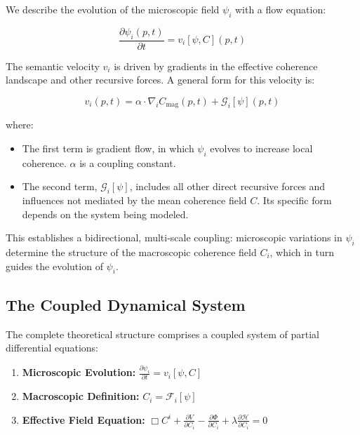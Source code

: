 We describe the evolution of the microscopic field \(\psi_i\) with a flow equation:

\begin{equation}
\frac{\partial \psi_i(p, t)}{\partial t} = v_i[\psi, C](p, t)
\end{equation}

The semantic velocity \(v_i\) is driven by gradients in the effective coherence landscape and other recursive forces. A general form for this velocity is:

\begin{equation}
v_i(p, t) = \alpha \cdot \nabla_i C_{\mathrm{mag}}(p, t) + \mathcal{G}_i[\psi](p, t)
\end{equation}

where:

\begin{itemize}

    \item The first term is gradient flow, in which \(\psi_i\) evolves to increase local coherence. \(\alpha\) is a coupling constant.
    
    \item The second term, \(\mathcal{G}_i[\psi]\), includes all other direct recursive forces and influences not mediated by the mean coherence field \(C\). Its specific form depends on the system being modeled.

\end{itemize}

This establishes a bidirectional, multi-scale coupling: microscopic variations in \(\psi_i\) determine the structure of the macroscopic coherence field \(C_i\), which in turn guides the evolution of \(\psi_i\).


\subsection{The Coupled Dynamical System}
\label{6.5.2:the_coupled_dynamical_system}

The complete theoretical structure comprises a coupled system of partial differential equations:

\begin{enumerate}

    \item \textbf{Microscopic Evolution:} \(\displaystyle \frac{\partial \psi_i}{\partial t} = v_i[\psi, C]\)
    
    \item \textbf{Macroscopic Definition:} \(C_i = \mathcal{F}_i[\psi]\)
    
    \item \textbf{Effective Field Equation:} \(\Box C^i + \frac{\partial V}{\partial C_i} - \frac{\partial \Phi}{\partial C_i} + \lambda \frac{\partial \mathcal{H}}{\partial C_i} = 0\)

\end{enumerate}

